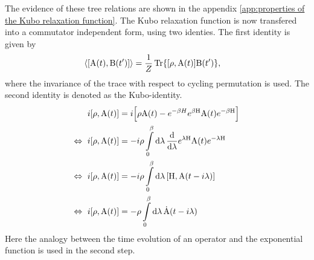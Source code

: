 %
%
The evidence of these tree relations are shown in the appendix \ref{app:properties of the Kubo relaxation function}.
The Kubo relaxation function is now transfered into a commutator independent form, using two identies.
The first identity is given by
%
\begin{align}
	\expval{\comm{\mt{A}(t)}{\mt{B}(t')}} &= \frac{1}{Z} \Tr{\comm{\rho}{\mt{A}(t)} \mt{B}(t')},
	\label{eq:identity expectation value}
\end{align}
%
where the invariance of the trace with respect to cycling permutation is used.
The second identity is denoted as the Kubo-identity.
%
\begin{align}
	i \comm{\rho}{\mt{A}(t)} &= i \Big[\rho \mt{A}(t) - e^{-\beta H} e^{\beta \mt{H}} \mt{A}(t) e^{-\beta \mt{H}}\Big]
	\notag \\
	\Leftrightarrow\ i \comm{\rho}{\mt{A}(t)} &= -i \rho \int\limits_{0}^{\beta} \dd{\lambda} \dv{\lambda} e^{\lambda \mt{H}} \mt{A}(t) e^{-\lambda \mt{H}}
	\notag \\
	\Leftrightarrow\ i \comm{\rho}{\mt{A}(t)} &= -i \rho \int\limits_{0}^{\beta} \dd{\lambda} \comm{\mt{H}}{\mt{A}(t-i\lambda)}
	\notag \\
	\Leftrightarrow\ i \comm{\rho}{\mt{A}(t)} &= -\rho \int\limits_{0}^{\beta} \dd{\lambda} \dot{\mt{A}}(t-i\lambda)
	\label{eq:Kubo-identity}
\end{align}
%
Here the analogy between the time evolution of an operator and the exponential function is used in the second step.
